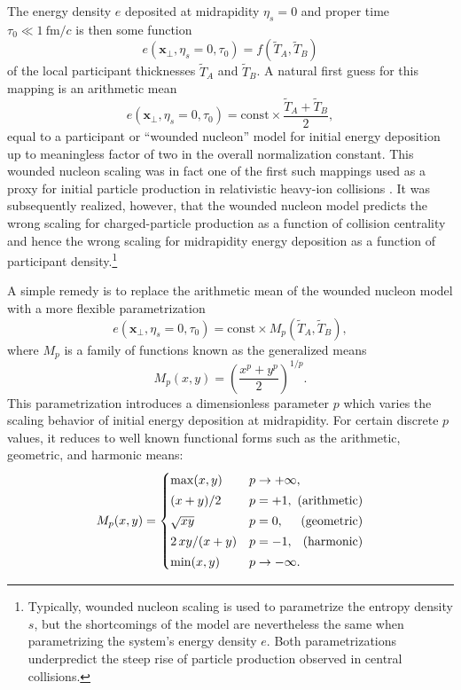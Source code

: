\documentclass[aps,prc,reprint,amsmath,nofootinbib]{revtex4-1}
\newcommand{\fmc}{\ensuremath{\text{fm}/c}}
\newcommand{\T}{\tilde{T}}
\newcommand{\xv}{\mathbf x}
\begin{document}
The energy density $e$ deposited at midrapidity $\eta_s=0$ and proper time $\tau_0 \ll 1~\fmc$ is then some function
\begin{equation}
  e(\xv_\perp, \eta_s=0, \tau_0) = f(\T_A, \T_B)
\end{equation}
of the local participant thicknesses $\T_A$ and $\T_B$.
A natural first guess for this mapping is an arithmetic mean
\begin{equation}
  e(\xv_\perp, \eta_s=0, \tau_0) = \text{const} \times \frac{\T_A + \T_B}{2},
\end{equation}
equal to a participant or ``wounded nucleon'' model for initial energy deposition up to meaningless factor of two in the overall normalization constant.
This wounded nucleon scaling was in fact one of the first such mappings used as a proxy for initial particle production in relativistic heavy-ion collisions \cite{Bialas:1976ed}.
It was subsequently realized, however, that the wounded nucleon model predicts the wrong scaling for charged-particle production as a function of collision centrality \cite{Kharzeev:2000ph} and hence the wrong scaling for midrapidity energy deposition as a function of participant density.\footnote{Typically, wounded nucleon scaling is used to parametrize the entropy density $s$, but the shortcomings of the model are nevertheless the same when parametrizing the system's energy density $e$. Both parametrizations underpredict the steep rise of particle production observed in central collisions.}

A simple remedy is to replace the arithmetic mean of the wounded nucleon model with a more flexible parametrization
\begin{equation}
  \label{eq:gmean}
  e(\xv_\perp, \eta_s=0, \tau_0) = \text{const} \times M_p(\T_A, \T_B),
\end{equation}
where $M_p$ is a family of functions known as the generalized means
\begin{equation}
  M_p(x, y) = \left( \frac{x^p + y^p}{2} \right)^{1/p}.
\end{equation}
This parametrization introduces a dimensionless parameter $p$ which varies the scaling behavior of initial energy deposition at midrapidity.
For certain discrete $p$ values, it reduces to well known functional forms such as the arithmetic, geometric, and harmonic means:
\begin{equation}
  \newlength{\extraspace}
  \setlength{\extraspace}{0.5ex}
  M_p(x, y) =
  \begin{cases}
    \max(x, y) & p \rightarrow +\infty, \\[\extraspace]
    (x + y)/2 & p = +1, \hfill \text{ (arithmetic)} \\[\extraspace]
    \sqrt{x y} & p = 0, \hfill \text{ (geometric)} \\[\extraspace]
    2\, x y/(x + y) & p = -1, \hfill \text{ (harmonic)} \\[\extraspace]
    \min(x, y) & p \rightarrow -\infty.
  \end{cases}
  \label{eq:trento_p}
\end{equation}
\end{document}
